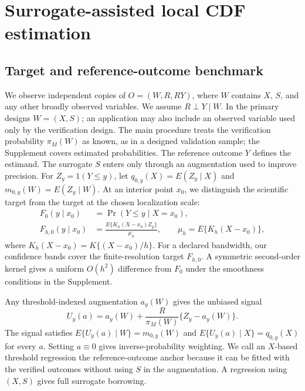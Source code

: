 \section{Surrogate-assisted local CDF estimation}
\label{sec:method}

\subsection{Target and reference-outcome benchmark}

We observe independent copies of \(O=(W,R,RY)\), where \(W\) contains \(X\),
\(S\), and any other broadly observed variables. We assume
\(R\perp Y\mid W\). In the primary designs \(W=(X,S)\); an application may
also include an observed variable used only by the verification design. The
main procedure treats the verification
probability \(\pi_M(W)\) as known, as in a designed validation sample; the
Supplement covers estimated probabilities. The reference outcome \(Y\) defines
the estimand. The surrogate \(S\) enters only through an augmentation used to
improve precision. For \(Z_y=1(Y\le y)\), let
\(q_{0,y}(X)=E(Z_y\mid X)\) and \(m_{0,y}(W)=E(Z_y\mid W)\). At an interior point
\(x_0\), we distinguish the scientific target from the target at the chosen
localization scale:
\begin{equation}
\begin{aligned}
F_0(y\mid x_0)
&=\Pr(Y\le y\mid X=x_0),\\
F_{h,0}(y\mid x_0)
&=
\frac{E\{K_h(X-x_0)Z_y\}}{\mu_h},
\qquad
\mu_h=E\{K_h(X-x_0)\},
\end{aligned}
\label{eq:regular-target}
\end{equation}
where \(K_h(X-x_0)=K\{(X-x_0)/h\}\). For a declared bandwidth, our
confidence bands cover the finite-resolution target \(F_{h,0}\). A symmetric
second-order kernel gives a uniform \(O(h^2)\) difference from \(F_0\) under the
smoothness conditions in the Supplement.

Any threshold-indexed augmentation \(a_y(W)\) gives the unbiased signal
\begin{equation}
U_y(a)
=
a_y(W)+\frac{R}{\pi_M(W)}\{Z_y-a_y(W)\}.
\label{eq:pseudo}
\end{equation}
The signal satisfies \(E\{U_y(a)\mid W\}=m_{0,y}(W)\) and
\(E\{U_y(a)\mid X\}=q_{0,y}(X)\) for every \(a\). Setting \(a\equiv0\) gives
inverse-probability weighting. We call an \(X\)-based threshold regression the
reference-outcome anchor because it can be fitted with the verified outcomes
without using \(S\) in the augmentation. A regression using \((X,S)\) gives full
surrogate borrowing.

